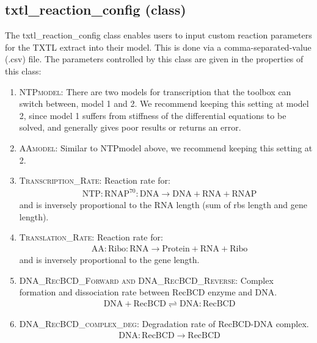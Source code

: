 \documentclass[english]{report}
\begin{document}
		\subsection*{txtl\_reaction\_config (class)}
		The txtl\_reaction\_config class enables users to input custom reaction parameters for the TXTL extract into their model. This is done via a comma-separated-value (.csv) file. The parameters controlled by this class are given in the properties of this class:
			\begin{enumerate}
			\item \textsc{NTPmodel}: 
			There are two models for transcription that the toolbox can switch between, model 1 and 2. We recommend keeping this setting at model 2, since model 1 suffers from stiffness of the differential equations to be solved, and generally gives poor results or returns an error. 
        	\item \textsc{AAmodel}: 
        	Similar to NTPmodel above, we recommend keeping this setting at 2. 
        	\item \textsc{Transcription\_Rate}:
        	Reaction rate for: \\
        	\begin{align}
        	& \mathrm{NTP:RNAP^{70}:DNA} \rightarrow \mathrm{DNA} + \mathrm{RNA} + \mathrm{RNAP} 
        	\end{align}
        	and is inversely proportional to the RNA length (sum of rbs length and gene length). 
        	
        	\item \textsc{Translation\_Rate}: Reaction rate for: \\
        	\begin{align}
        	& \mathrm{AA:Ribo:RNA}  \rightarrow \mathrm{Protein} + \mathrm{RNA} + \mathrm{Ribo}
        	\end{align}
        	and is inversely proportional to the gene length. 
        	\item \textsc{DNA\_RecBCD\_Forward and DNA\_RecBCD\_Reverse}:
        	Complex formation and dissociation rate between RecBCD enzyme and DNA.        	
        	\begin{align}
        	& \mathrm{DNA} + \mathrm{RecBCD}  \rightleftharpoons \mathrm{DNA:RecBCD}
        	\end{align}
        	
        	
        	\item \textsc{DNA\_RecBCD\_complex\_deg}: 
        	Degradation rate of RecBCD-DNA complex. 
        	\begin{align}
        	& \mathrm{DNA:RecBCD} \rightarrow  \mathrm{RecBCD} 
        	\end{align}
        	

\end{enumerate}
\end{document}
